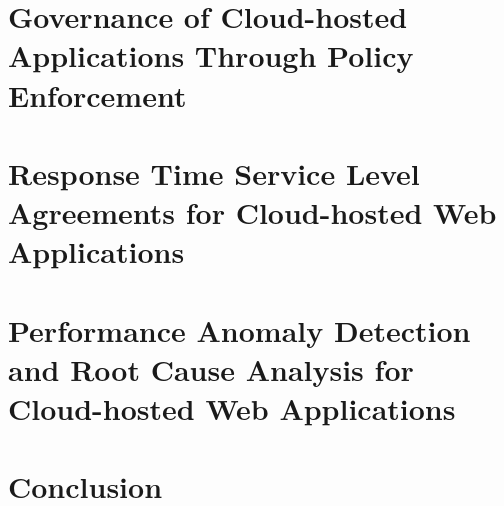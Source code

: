 \documentclass[oneside,12pt,final]{ucthesis-CA2012}
\begin{document}
\begin{mainmatter}
\chapter{Governance of Cloud-hosted Applications Through Policy Enforcement}
\label{sec:eager}


\chapter{Response Time Service Level Agreements for Cloud-hosted Web Applications}
\label{sec:cerebro}


\chapter{Performance Anomaly Detection and Root Cause Analysis for Cloud-hosted Web Applications}
\label{sec:roots}


\chapter{Conclusion}
\label{sec:conculsion}



%
%
%
%

\end{mainmatter}

\ssp


\end{document}
